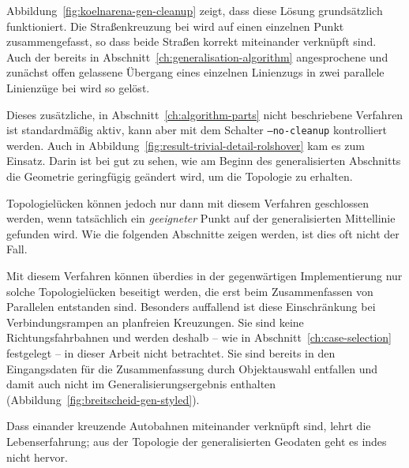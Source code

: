 \documentclass[../main/thesis.tex]{subfiles}
\begin{document}
Abbildung~\ref{fig:koelnarena-gen-cleanup} zeigt, dass diese Lösung grundsätzlich funktioniert.
Die Straßenkreuzung bei  wird auf einen einzelnen Punkt zusammengefasst, so dass beide Straßen korrekt miteinander verknüpft sind.
Auch der bereits in Abschnitt~\ref{ch:generalisation-algorithm} angesprochene und zunächst offen gelassene Übergang eines einzelnen Linienzugs in zwei parallele Linienzüge bei  wird so gelöst.

Dieses zusätzliche, in Abschnitt~\ref{ch:algorithm-parts} nicht beschriebene Verfahren ist standardmäßig aktiv, kann aber mit dem Schalter \texttt{--no-cleanup} kontrolliert werden.
Auch in Abbildung~\ref{fig:result-trivial-detail-rolshover} kam es zum Einsatz.
Darin ist bei  gut zu sehen, wie am Beginn des generalisierten Abschnitts die Geometrie geringfügig geändert wird, um die Topologie zu erhalten.

Topologielücken können jedoch nur dann mit diesem Verfahren geschlossen werden, wenn tatsächlich ein \emph{geeigneter} Punkt auf der generalisierten Mittellinie gefunden wird.
Wie die folgenden Abschnitte zeigen werden, ist dies oft nicht der Fall.

Mit diesem Verfahren können überdies in der gegenwärtigen Implementierung nur solche Topologielücken beseitigt werden, die erst beim Zusammenfassen von Parallelen entstanden sind.
Besonders auffallend ist diese Einschränkung bei Verbindungsrampen an planfreien Kreuzungen.
Sie sind keine Richtungsfahrbahnen und werden deshalb -- wie in Abschnitt~\ref{ch:case-selection} festgelegt -- in dieser Arbeit nicht betrachtet.
Sie sind bereits in den Eingangsdaten für die Zusammenfassung durch Objektauswahl entfallen und damit auch nicht im Generalisierungsergebnis enthalten (Abbildung~\ref{fig:breitscheid-gen-styled}).

Dass einander kreuzende Autobahnen miteinander verknüpft sind, lehrt die Lebenserfahrung; aus der Topologie der generalisierten Geodaten geht es indes nicht hervor.

\end{document}
